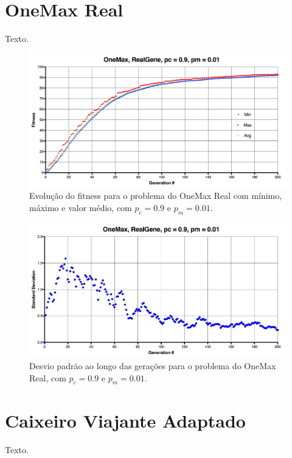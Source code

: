 \section{OneMax Real}

Texto.

\begin{figure}[ht!]
    \centering \includegraphics[width=1.0\textwidth]{onemax_real.jpg}
    \caption{Evolução do fitness para o problema do OneMax Real com mínimo, máximo e valor médio, com $p_c=0.9$ e $p_m=0.01$.}
    \label{fig:onemax_real}
\end{figure}

\begin{figure}[ht!]
    \centering \includegraphics[width=1.0\textwidth]{onemax_real_std.jpg}
    \caption{Desvio padrão ao longo das gerações para o problema do OneMax Real, com $p_c=0.9$ e $p_m=0.01$.}
    \label{fig:onemax_real_std}
\end{figure}

\section{Caixeiro Viajante Adaptado}

Texto.


